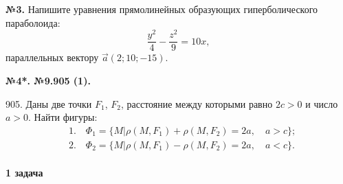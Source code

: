 \documentclass[a4paper,14pt]{extreport} %
\begin{document}
\noindent
\textbf{№3.} Напишите уравнения прямолинейных образующих гиперболического параболоида:
\[
\frac{y^2}{4} - \frac{z^2}{9} = 10x,
\]
параллельных вектору $\vec{a}(2; 10; -15)$.

\noindent
\textbf{№4*. №9.905 (1).}

905. Даны две точки $F_1$, $F_2$, расстояние между которыми равно $2c > 0$ и число $a > 0$. Найти фигуры:
\[
\begin{aligned}
    &1. \quad \Phi_1 = \{M | \rho(M, F_1) + \rho(M, F_2) = 2a, \quad a > c\}; \\
    &2. \quad \Phi_2 = \{M | \rho(M, F_1) - \rho(M, F_2) = 2a, \quad a < c\}.
\end{aligned}
\]
\noindent









\paragraph {1 задача}
\end{document}
